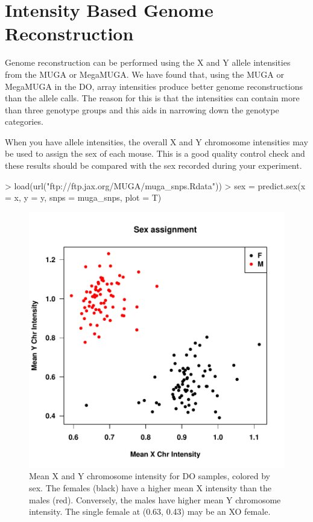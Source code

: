 \documentclass{article}
\begin{document}
\section{Intensity Based Genome Reconstruction}

Genome reconstruction can be performed using the X and Y allele intensities from the MUGA or 
MegaMUGA. We have found that, using the MUGA or MegaMUGA in the DO, array intensities produce 
better genome reconstructions than the allele calls. The reason for this is that the 
intensities can contain more than three genotype groups and this aids in narrowing down the 
genotype categories.

When you have allele intensities, the overall X and Y chromosome intensities may be used
to assign the sex of each mouse. This is a good quality control check and these results
should be compared with the sex recorded during your experiment.

\begin{Schunk}
\begin{Sinput}
> load(url("ftp://ftp.jax.org/MUGA/muga_snps.Rdata"))
> sex = predict.sex(x = x, y = y, snps = muga_snps, plot = T)
\end{Sinput}
\end{Schunk}

\begin{figure}
\begin{center}
\includegraphics{Genotyping_DO_Mice-fig1}
\end{center}
\caption{Mean X and Y chromosome intensity for DO samples, colored by sex. The females (black) have a higher mean X intensity than the males (red). Conversely, the males have higher mean Y chromosome intensity. The single female at (0.63, 0.43) may be an XO female. }
\label{fig:predict_sex}
\end{figure}
\end{document}
